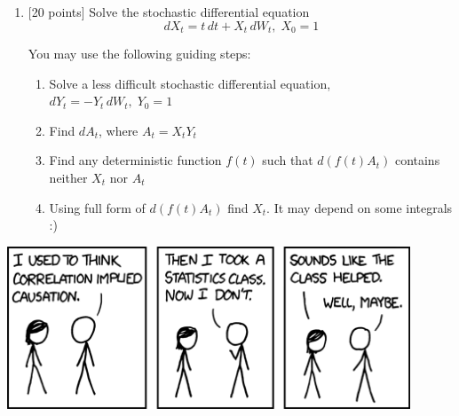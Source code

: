 \documentclass[12pt,a4paper]{article}
\begin{document}
\begin{enumerate}
\item $[$20 points] Solve the stochastic differential equation 
\[
dX_t = t \, dt + X_t \, dW_t, \; X_0=1
\]

You may use the following guiding steps:
\begin{enumerate}
\item Solve a less difficult stochastic differential equation, $dY_t=-Y_t \, dW_t, \; Y_0=1$
\item Find $dA_t$, where $A_t=X_t Y_t$ 
\item Find any deterministic function $f(t)$ such that $d(f(t) A_t)$ contains neither $X_t$ nor $A_t$
\item Using full form of $d(f(t) A_t)$ find $X_t$. It may depend on some integrals :)
\end{enumerate}

\end{enumerate}

\begin{center}
\includegraphics[width=12cm]{correlation.png} 
\end{center}
\end{document}
